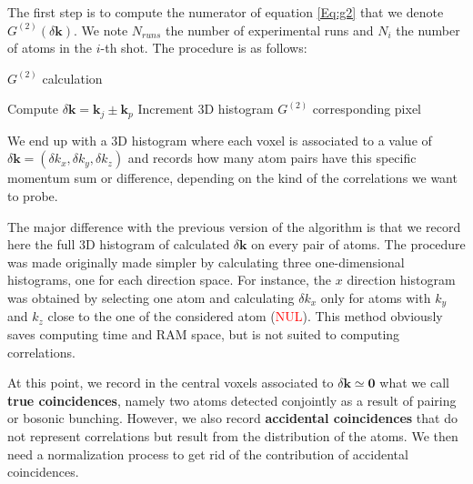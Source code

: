 The first step is to compute the numerator of equation \ref{Eq:g2} that we denote $G^{(2)}(\delta \bm{k})$. We note $N_{runs}$ the number of experimental runs and $N_{i}$ the number of atoms in the $i$-th shot. The procedure is as follows:


\begin{algorithm}
 \caption{$G^{(2)}$ calculation}
    \begin{algorithmic}
                    \State Compute $\delta \bm{k} = \bm{k}_j \pm \bm{k}_p$
                    \State Increment 3D histogram $G^{(2)}$ corresponding pixel
                \EndFor
            \EndFor
        \EndFor
\end{algorithmic}

\end{algorithm}

We end up with a 3D histogram where each voxel is associated to a value of $\delta \bm{k} = (\delta k_x,\delta k_y, \delta k_z)$ and records how many atom pairs have this specific momentum sum or difference, depending on the kind of the correlations we want to probe.

The major difference with the previous version of the algorithm is that we record here the full 3D histogram of calculated $\delta \bm{k}$ on every pair of atoms. The procedure was made originally made simpler by calculating three one-dimensional histograms, one for each direction space. For instance, the $x$ direction histogram was obtained by selecting one atom and calculating $\delta k_x$ only for atoms with $k_y$ and $k_z$ close to the one of the considered atom (\textcolor{red}{NUL}). This method obviously saves computing time and RAM space, but is not suited to computing \kmk correlations.

At this point, we record in the central voxels associated to $\delta \bm{k} \simeq \bm{0}$ what we call \textbf{true coincidences}, namely two atoms detected conjointly as a result of \kmk pairing or bosonic bunching. However, we also record \textbf{accidental coincidences} that do not represent correlations but result from the distribution of the atoms. We then need a normalization process to get rid of the contribution of accidental coincidences. 


